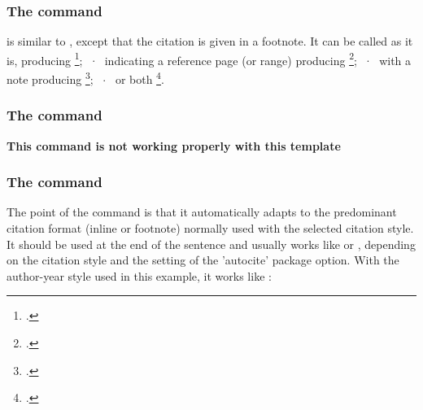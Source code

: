 \subsubsection*{The  command}

is similar to , except that the
citation is given in a footnote.
It can be called as it is,  producing \footcite{companion};
~$\cdot$~
indicating a reference page (or range)  producing \footcite[59]{companion};
~$\cdot$~
with a note  producing \footcite[see][]{companion};
~$\cdot$~
or both  \footcite[see][59--63]{companion}.

\subsubsection*{The  command}

\textbf{This command is not working properly with this template}






\subsubsection*{The  command}

The point of the  command is that it automatically adapts
to the predominant citation format (inline or footnote) normally
used with the selected citation style. It should be used at the
end of the sentence and usually works like  or
, depending on the citation style and the setting of the
'autocite' package option. With the author-year style used in this
example, it works like :

